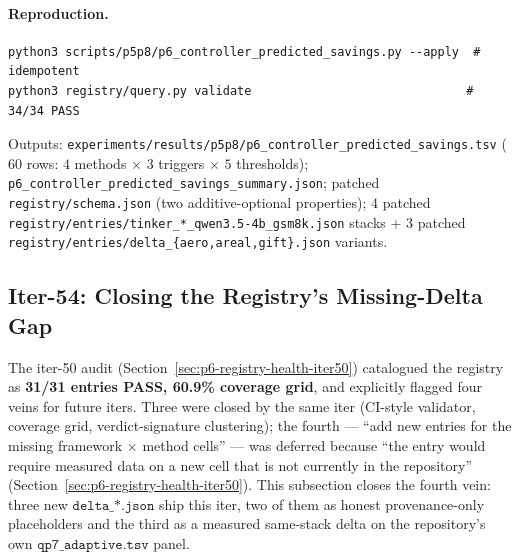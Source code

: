 \documentclass{article}
\begin{document}
\paragraph{Reproduction.}
\begin{verbatim}
python3 scripts/p5p8/p6_controller_predicted_savings.py --apply  # idempotent
python3 registry/query.py validate                              # 34/34 PASS
\end{verbatim}
Outputs: \texttt{experiments/results/p5p8/p6\_controller\_predicted\_savings.tsv}
($60$ rows: $4$ methods $\times$ $3$ triggers $\times$ $5$ thresholds);
\texttt{p6\_controller\_predicted\_savings\_summary.json}; patched
\texttt{registry/schema.json} (two additive-optional properties); $4$ patched
\texttt{registry/entries/tinker\_*\_qwen3.5-4b\_gsm8k.json} stacks + $3$
patched \texttt{registry/entries/delta\_\{aero,areal,gift\}.json} variants.
 \subsection{Iter-54: Closing the Registry's Missing-Delta Gap}
\label{sec:p6-missing-deltas}

The iter-50 audit (Section~\ref{sec:p6-registry-health-iter50})
catalogued the registry as \textbf{31/31 entries PASS, 60.9\%
coverage grid}, and explicitly flagged four veins for future iters.
Three were closed by the same iter (CI-style validator, coverage grid,
verdict-signature clustering); the fourth --- ``add new entries for
the missing framework $\times$ method cells'' --- was deferred because
``the entry would require measured data on a new cell that is not
currently in the repository'' (Section~\ref{sec:p6-registry-health-iter50}).
This subsection
closes the fourth vein: three new $\texttt{delta\_*.json}$ ship this
iter, two of them as honest provenance-only placeholders and the
third as a measured same-stack delta on the repository's own
$\texttt{qp7\_adaptive.tsv}$ panel.
\end{document}
